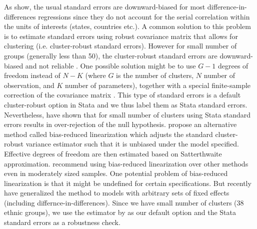 As \citet{bertrand_how_2004} show, the usual standard errors  are downward-biased for most difference-in-differences regressions since they do not account for the serial correlation within the units of interests (states, countries etc.). A common solution to this problem is to estimate standard errors using robust covariance matrix that allows for clustering (i.e. cluster-robust standard errors). However for small number of groups (generally less than 50), the cluster-robust standard errors are downward-biased and not reliable \citep[chapter 8]{donald_inference_2007, angrist_mostly_2009}.
One possible solution might be to use $G - 1$ degrees of freedom   instead of $N - K$ (where $G$ is the number of clusters, $N$ number of observation, and $K$ number of parameters),
together with a special finite-sample correction of the covariance matrix \citep{angrist_mostly_2009, cameron_practitioners_2015, imbens_robust_2016}.
 This type of standard errors is a default cluster-robust option in Stata and we thus label them as Stata  standard errors. Nevertheless, \citet{imbens_robust_2016} have shown  that for small number of clusters using Stata standard errors  results in over-rejection of the null hypothesis. 
\citet{mccaffrey_bias_2002} propose an alternative method called bias-reduced linearization which  adjusts the standard cluster-robust variance estimator such that it is unbiased under the model specified. 
Effective degrees of freedom are then estimated based on  Satterthwaite approximation. 
\citet{imbens_robust_2016} recommend using  bias-reduced linearization over other methods even in  moderately sized samples. One potential problem of bias-reduced linearization is that it might be undefined for certain specifications. But recently  \citet{pustejovsky_small-sample_2018} have generalized the method to models with arbitrary sets of fixed effects (including differnce-in-differences). 
Since we have small number of clusters (38 ethnic groups), we use the  estimator by \citet{pustejovsky_small-sample_2018}  as our default option and the Stata  standard errors as a robustness check. 



